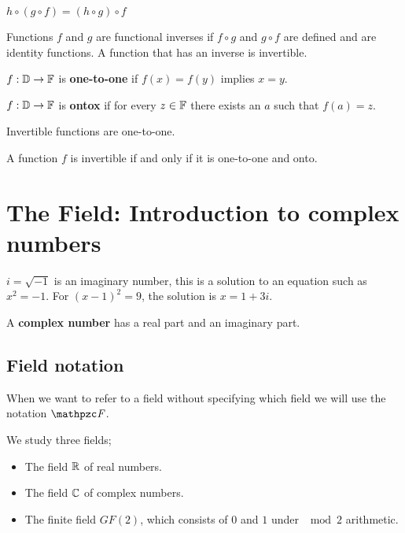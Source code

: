 \begin{proposition}
  $h \circ (g \circ f) = (h \circ g) \circ f$
\end{proposition}

\begin{definition}
  Functions $f$ and $g$ are functional inverses if $f \circ g$ and $g \circ f$ are defined and are identity functions. A function that has an inverse is invertible.
\end{definition}

\begin{definition}
  $f : {\mathbb{D}} \rightarrow {\mathbb{F}}$ is \textbf{one-to-one} if $f(x) = f(y)$ implies $x = y$.
\end{definition}

\begin{definition}
  $f : {\mathbb{D}} \rightarrow {\mathbb{F}}$ is \textbf{ontox} if for every $z \in {\mathbb{F}}$ there exists an $a$ such that $f(a) = z$.
\end{definition}

\begin{proposition}
  Invertible functions are one-to-one.
\end{proposition}

\begin{theorem}
  A function $f$ is invertible if and only if it is one-to-one and onto.
\end{theorem}


\section{The Field: Introduction to complex numbers}

$i = \sqrt{-1}$ is an imaginary number, this is a solution to an equation such as $x^2 = -1$. For $(x-1)^2 = 9$, the solution is $x = 1 + 3i$.

A \textbf{complex number} has a real part and an imaginary part.

\subsection{Field notation}
When we want to refer to a field without specifying which field we will use the notation $\fF$.

We study three fields;
\begin{itemize}
\item The field $\mathbb{R}$ of real numbers.
\item The field ${\mathbb{C}}$ of complex numbers.
\item The finite field $GF(2)$, which consists of $0$ and $1$ under $\mod 2$ arithmetic.
\end{itemize}

